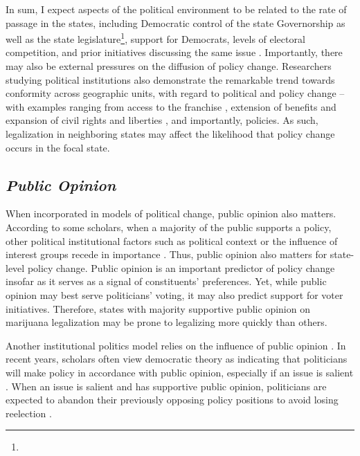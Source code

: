 In sum, I expect aspects of the political environment to be related to the rate of passage in the states, including Democratic control of the state Governorship as well as the state legislature\footnote{}, support for Democrats, levels of electoral competition, and prior initiatives discussing the same issue \citep{key_1957,boushey_2016}. Importantly, there may also be external pressures on the diffusion of policy change. Researchers studying political institutions also demonstrate the remarkable trend towards conformity across geographic units, with regard to political and policy change -- with examples ranging from access to the franchise \citep{uggen_and_manza_2002,manza_and_brooks_1999}, extension of benefits \citep{amenta_2006,amenta_et_al_2005} and expansion of civil rights and liberties \citep{andrews_1997}, and importantly, policies. As such, legalization in neighboring states may affect the likelihood that policy change occurs in the focal state. 



\subsection{\it{Public Opinion}}

When incorporated in models of political change, public opinion also matters. According to some scholars, when a majority of the public supports a policy, other political institutional factors such as political context or the influence of interest groups recede in importance \citep{burstein_and_linton_2002,burstein_and_hirsch_2007}. Thus, public opinion also matters for state-level policy change. Public opinion is an important predictor of policy change insofar as it serves as a signal of constituents' preferences. Yet, while public opinion may best serve politicians' voting, it may also predict support for voter initiatives. Therefore, states with majority supportive public opinion on marijuana legalization may be prone to legalizing more quickly than others.


Another institutional politics model relies on the influence of public opinion \citep{burstein_1998,burstein_2003}. In recent years, scholars often view democratic theory as indicating that politicians will make policy in accordance with public opinion, especially if an issue is salient \citep{pacheco_2012,nicholson-crotty_2009}. When an issue is salient and has supportive public opinion, politicians are expected to abandon their previously opposing policy positions to avoid losing reelection \citep{page_and_shapiro_1992}.



